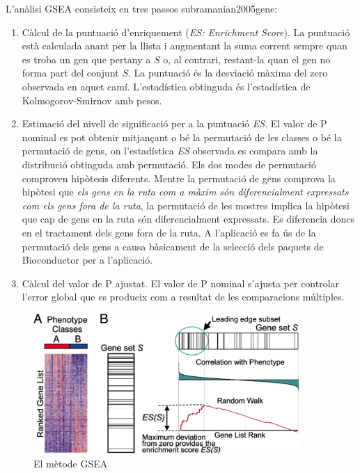 L'anàlisi \gls{GSEA} consisteix en tres passos subramanian2005gene:

\begin{enumerate}
\item Càlcul de la puntuació d'enriquement (\textit{\gls{ES}: Enrichment Score}). La puntuació està calculada anant per la llista i augmentant la suma corrent sempre quan es troba un gen que pertany a $S$ o, al contrari, restant-la quan el gen no forma part del conjunt $S$. La puntuació és la desviació màxima del zero observada en aquet camí. L'estadística obtinguda és l’estadística de Kolmogorov-Smirnov amb pesos.

\item Estimació del nivell de significació per a la puntuació \textit{\gls{ES}}. El valor de P nominal es pot obtenir mitjançant o bé la permutació de les classes o bé la permutació de gens, on l'estadística \textit{\gls{ES}} observada es compara amb la distribució obtinguda amb permutació. Els dos modes de permutació comproven hipòtesis diferents. Mentre la permutació de gens comprova la hipòtesi que \textit{els gens en la ruta com a màxim són diferencialment expressats com els gens fora de la ruta},
la permutació de les mostres implica la hipòtesi que cap de gens en la ruta són diferencialment expressats. Es diferencia doncs en el tractament dels gens fora de la ruta. A l'aplicació es fa ús de la permutació dels gens a causa bàsicament de la selecció dels paquets de \gls{Bioconductor} per a l’aplicació.


\item Càlcul del valor de P ajustat. El valor de P nominal s'ajusta per controlar l'error global que es produeix com a resultat de les comparacions múltiples.
\end{enumerate}

\begin{figure}[H]
\centering
\includegraphics[width=0.9\textwidth]{figures/GSEA_Method.jpg} 
\caption{El mètode \gls{GSEA}}
\end{figure}

